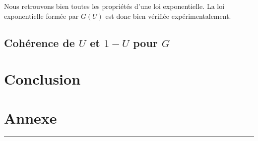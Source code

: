\documentclass[12,french]{report}
\begin{document}
Nous retrouvons bien toutes les propriétés d'une loi exponentielle. La loi exponentielle formée par $G(U)$ est donc bien vérifiée expérimentalement.

\section{Cohérence de $U$ et $1-U$ pour $G$}


\chapter*{Conclusion}

\chapter*{Annexe}

\hrule
\begin{lstlisting}[caption=Programme en Python]

\end{lstlisting}


\end{document}
